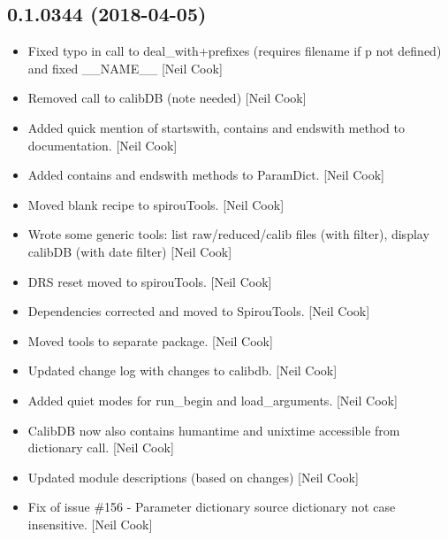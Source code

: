 \documentclass[a4paper,10pt,english]{report}
\begin{document}
\subsection{0.1.0344 (2018-04-05)}
\label{\detokenize{misc/changelog:id466}}\begin{itemize}
\item {} 
Fixed typo in call to deal\_with+prefixes (requires filename if p not
defined) and fixed \_\_NAME\_\_ {[}Neil Cook{]}

\item {} 
Removed call to calibDB (note needed) {[}Neil Cook{]}

\item {} 
Added quick mention of startswith, contains and endswith method to
documentation. {[}Neil Cook{]}

\item {} 
Added contains and endswith methods to ParamDict. {[}Neil Cook{]}

\item {} 
Moved blank recipe to spirouTools. {[}Neil Cook{]}

\item {} 
Wrote some generic tools: list raw/reduced/calib files (with filter),
display calibDB (with date filter) {[}Neil Cook{]}

\item {} 
DRS reset moved to spirouTools. {[}Neil Cook{]}

\item {} 
Dependencies corrected and moved to SpirouTools. {[}Neil Cook{]}

\item {} 
Moved tools to separate package. {[}Neil Cook{]}

\item {} 
Updated change log with changes to calibdb. {[}Neil Cook{]}

\item {} 
Added quiet modes for run\_begin and load\_arguments. {[}Neil Cook{]}

\item {} 
CalibDB now also contains humantime and unixtime accessible from
dictionary call. {[}Neil Cook{]}

\item {} 
Updated module descriptions (based on changes) {[}Neil Cook{]}

\item {} 
Fix of issue \#156 - Parameter dictionary source dictionary not case
insensitive. {[}Neil Cook{]}


\end{itemize}
\end{document}
